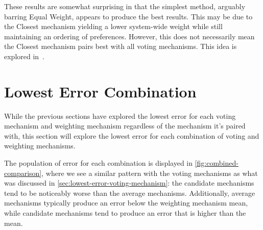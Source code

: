 These results are somewhat surprising in that the simplest method, arguably barring
Equal Weight, appears to produce the best results.
This may be due to the Closest mechanism yielding a lower system-wide weight while
still maintaining an ordering of preferences.
However, this does not necessarily mean the Closest mechanism pairs best with all
voting mechanisms.
This idea is explored in~.


\section{Lowest Error Combination}\label{sec:lowest-error-overall-combination}
While the previous sections have explored the lowest error for each voting mechanism and
weighting mechanism regardless of the mechanism it's paired with, this section will
explore the lowest error for each combination of voting and weighting mechanisms.

The population of error for each combination is displayed in
\autoref{fig:combined-comparison}, where we see a similar pattern with the voting
mechanisms as what was discussed in \autoref{sec:lowest-error-voting-mechanism}: the
candidate mechanisms tend to be noticeably worse than the average mechanisms.
Additionally, average mechanisms typically produce an error below the weighting
mechanism mean, while candidate mechanisms tend to produce an error that is higher
than the mean.

